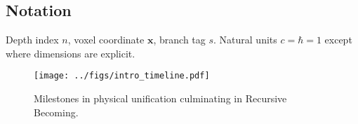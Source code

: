 \subsection{Notation}

Depth index $n$, voxel coordinate $\mathbf x$, branch tag $s$.
Natural units $c=\hbar=1$ except where dimensions are explicit.

\begin{figure}[t]
  \centering
\texttt{[image: ../figs/intro\_timeline.pdf]}


  \caption{Milestones in physical unification culminating in Recursive Becoming.}
  \label{fig:intro-timeline}
\end{figure}

\clearpage
